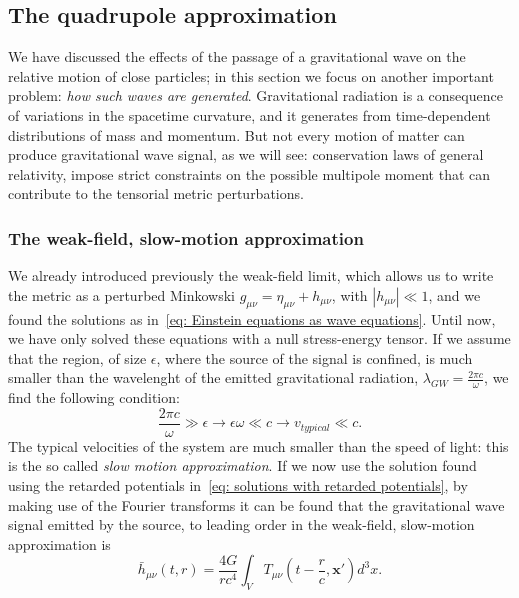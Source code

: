 \subsection{The quadrupole approximation}
We have discussed the effects of the passage of a gravitational wave on the relative motion of close particles; in this section we focus on another important problem: \textit{how such waves are generated}.
Gravitational radiation is a consequence of variations in the spacetime curvature, and it generates from time-dependent distributions of mass and momentum.
But not every motion of matter can produce gravitational wave signal, as we will see: conservation laws of general relativity, impose strict constraints on the possible multipole moment that can contribute to the tensorial metric perturbations.


\subsubsection{The weak-field, slow-motion approximation}
We already introduced previously the weak-field limit, which allows us to write the metric as a perturbed Minkowski $g_{\mu\nu}=\eta_{\mu\nu} + h_{\mu\nu}$, with $|h_{\mu\nu}|\ll 1$, and we found the solutions as in~\eqref{eq: Einstein equations as wave equations}.
Until now, we have only solved these equations with a null stress-energy tensor.
If we assume that the region, of size $\epsilon$, where the source of the signal is confined, is much smaller than the wavelenght of the emitted gravitational radiation, $\lambda_{GW} = \frac{2\pi c}{\omega}$, we find the following condition:
\begin{equation}
    \frac{2\pi c}{\omega}\gg \epsilon \to \epsilon\omega \ll c \to v_{typical} \ll c.
    \label{eq: slow motion approximation}
\end{equation}
The typical velocities of the system are much smaller than the speed of light: this is the so called \textit{slow motion approximation}.
If we now use the solution found using the retarded potentials in~\eqref{eq: solutions with retarded potentials}, by making use of the Fourier transforms it can be found that the gravitational wave signal emitted by the source, to leading order in the weak-field, slow-motion approximation is
\begin{equation}
    \bar{h}_{\mu\nu}(t,r) = \frac{4G}{rc^4}\int_V T_{\mu\nu}(t-\frac{r}{c}, \mathbf{x}')d^3x.
    \label{eq: weak-field slow-motion solutions}
\end{equation}

